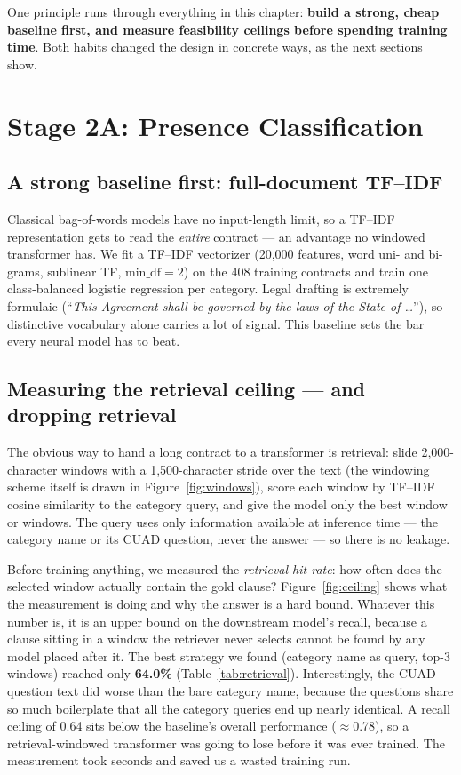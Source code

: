 One principle runs through everything in this chapter: \textbf{build a strong, cheap baseline first, and measure feasibility ceilings before spending training time}. Both habits changed the design in concrete ways, as the next sections show.

\section{Stage 2A: Presence Classification}

\subsection{A strong baseline first: full-document TF--IDF}
Classical bag-of-words models have no input-length limit, so a TF--IDF representation gets to read the \emph{entire} contract --- an advantage no windowed transformer has. We fit a TF--IDF vectorizer (20{,}000 features, word uni- and bi-grams, sublinear TF, $\text{min\_df}=2$) on the 408 training contracts and train one class-balanced logistic regression per category. Legal drafting is extremely formulaic (``\emph{This Agreement shall be governed by the laws of the State of \ldots}''), so distinctive vocabulary alone carries a lot of signal. This baseline sets the bar every neural model has to beat.

\subsection{Measuring the retrieval ceiling --- and dropping retrieval}
\label{sec:ceiling}
The obvious way to hand a long contract to a transformer is retrieval: slide 2{,}000-character windows with a 1{,}500-character stride over the text (the windowing scheme itself is drawn in Figure~\ref{fig:windows}), score each window by TF--IDF cosine similarity to the category query, and give the model only the best window or windows. The query uses only information available at inference time --- the category name or its CUAD question, never the answer --- so there is no leakage.

Before training anything, we measured the \emph{retrieval hit-rate}: how often does the selected window actually contain the gold clause? Figure~\ref{fig:ceiling} shows what the measurement is doing and why the answer is a hard bound. Whatever this number is, it is an upper bound on the downstream model's recall, because a clause sitting in a window the retriever never selects cannot be found by any model placed after it. The best strategy we found (category name as query, top-3 windows) reached only \textbf{64.0\%} (Table~\ref{tab:retrieval}). Interestingly, the CUAD question text did worse than the bare category name, because the questions share so much boilerplate that all the category queries end up nearly identical. A recall ceiling of 0.64 sits below the baseline's overall performance ($\approx$0.78), so a retrieval-windowed transformer was going to lose before it was ever trained. The measurement took seconds and saved us a wasted training run.


